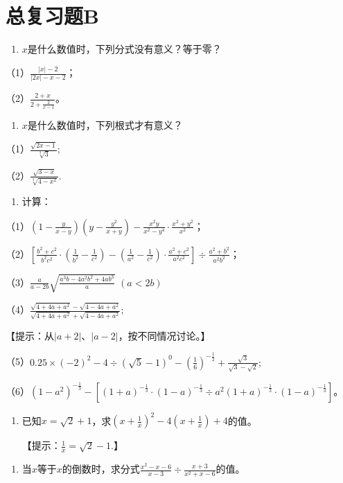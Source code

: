 \chapter{总复习题B}

\begin{enumerate}[start=1]
\item
  \(x\)是什么数值时，下列分式没有意义？等于零？
\end{enumerate}

（1）\(\frac{|x| - 2}{|2x| - x - 2}\)；

（2）\(\frac{2 + x}{2 + \frac{2}{x - 1}}\)。

\begin{enumerate}[start=2]
\item
  \(x\)是什么数值时，下列根式才有意义？
\end{enumerate}

（1）\(\frac{\sqrt{2x - 1}}{\sqrt[3]{3}};\)

（2）\(\frac{\sqrt{3 - x}}{\sqrt[3]{4 - x^2}}.\)

\begin{enumerate}[start=3]
\item
  计算：
\end{enumerate}

（1）\(\left(1 - \frac{y}{x - y}\right)\left(y - \frac{y^2}{x + y}\right) - \frac{x^2y}{x^2 - y^4} \cdot \frac{x^2 + y^2}{x^2}\)；

（2）\(\left[\frac{b^2 + c^2}{b^2c^2} \cdot \left(\frac{1}{b^2} - \frac{1}{c^2}\right) - \left(\frac{1}{a^2} - \frac{1}{c^2}\right) \cdot \frac{a^2 + c^2}{a^2c^2}\right] \div \frac{a^2 + b^2}{a^2b^2}\)；

（3）\(\frac{a}{a - 2b}\sqrt{\frac{a^3b - 4a^2b^2 + 4ab^3}{a}}\) \((a <   2b)\)

（4）\(\frac{\sqrt{4 + 4a + a^2} - \sqrt{4 - 4a + a^2}}{\sqrt{4 + 4a + a^2} + \sqrt{4 - 4a + a^2}};\)

【提示：从\(|a+2|\)、\(|a-2|\)，按不同情况讨论。】

（5）\(0.25 \times (-2)^{2} - 4 \div (\sqrt{5} - 1)^{0} - \left(\frac{1}{6}\right)^{-\frac{1}{2}} + \frac{\sqrt{3}}{\sqrt{3} - \sqrt{2}};\)

（6）\((1 - a^2)^{-\frac{1}{3}} - [(1 + a)^{-\frac{1}{3}} \cdot (1 - a)^{-\frac{1}{3}} \div a^2 (1 + a)^{-\frac{1}{3}} \cdot (1 - a)^{-\frac{1}{3}}]\)。

\begin{enumerate}[start=4,label={*\arabic*.}]
\item
  已知\(x = \sqrt{2} + 1\)，求\(\left(x + \frac{1}{x}\right)^2 - 4\left(x + \frac{1}{x}\right) + 4\)的值。

【提示：\(\frac{1}{x} = \sqrt{2} -1.\)】

\end{enumerate}
\begin{enumerate}[start=5]
\item
  当\(x\)等于\(x\)的倒数时，求分式\(\frac{x^2 - x - 6}{x - 3} \div \frac{x + 3}{x^2 + x - 6}\)的值。
\end{enumerate}

